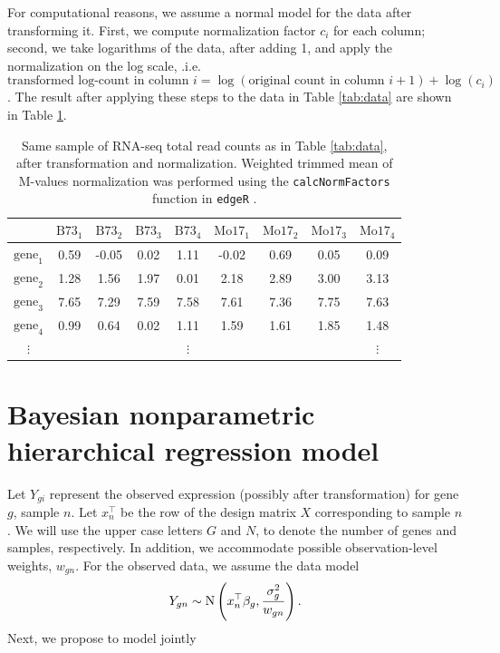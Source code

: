 For computational reasons, we assume a normal model for the data after transforming it. First, we compute normalization factor $c_i$ for each column; second, we take logarithms of the data, after adding 1, and apply the normalization on the log scale, .i.e.
$$\mbox{transformed log-count in column }i = \log (\mbox{original count in column }i+1) + \log(c_i)$$. The result after applying these steps to the data in Table \ref{tab:data} are shown in Table \ref{tab:data-transformed}.

\begin{table}[ht]
\centering
\caption{\small Same sample of RNA-seq total read counts as in Table \ref{tab:data}, after transformation and normalization. Weighted trimmed mean of M-values normalization was performed using the \texttt{calcNormFactors} function in \texttt{edgeR} \cite{edger2010}.}
\label{tab:data-transformed}
\vspace{.2in}
\begin{tabular}{ccccccccc}
  \hline
 & $\mbox{B73}_1$ & $\mbox{B73}_2$ & $\mbox{B73}_3$ & $\mbox{B73}_4$ & $\mbox{Mo17}_1$ & $\mbox{Mo17}_2$ & $\mbox{Mo17}_3$ & $\mbox{Mo17}_4$ \\ 
  \hline
$\mbox{gene}_1$ & 0.59 & -0.05 & 0.02 & 1.11 & -0.02 & 0.69 & 0.05 & 0.09 \\ 
$\mbox{gene}_2$ & 1.28 & 1.56 & 1.97 & 0.01 & 2.18 & 2.89 & 3.00 & 3.13 \\ 
$\mbox{gene}_3$ & 7.65 & 7.29 & 7.59 & 7.58 & 7.61 & 7.36 & 7.75 & 7.63 \\ 
$\mbox{gene}_4$ & 0.99 & 0.64 & 0.02 & 1.11 & 1.59 & 1.61 & 1.85 & 1.48 \\ 
$\vdots$ &  &  &  & $\vdots$ &  & &  & $\vdots$ \\ 
   \hline
\end{tabular}
\end{table}

\section{Bayesian nonparametric hierarchical regression model}
\label{sec:model}
Let $Y_{gi}$ represent the observed expression (possibly after transformation) for gene $g$, sample $n$. Let $x_{n}^\top$ be the row of the design matrix $X$ corresponding to sample $n$. We will use the upper case letters $G$ and $N$, to denote the number of genes and samples, respectively. In addition, we accommodate possible observation-level weights, $w_{gn}$. For the observed data, we assume the data model
\begin{equation}
Y_{gn} \sim \operatorname{N} \left( x_{n}^\top \beta_g, \frac{\sigma^2_g}{w_{gn}} \right).
\end{equation}
Next, we propose to model jointly

